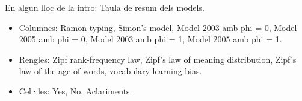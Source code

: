 En algun lloc de la intro: Taula de resum dels models.
\begin{itemize}
\item Columnes: Ramon typing, Simon's model, Model 2003 amb phi = 0, Model 2005 amb phi = 0, Model 2003 amb phi = 1, Model 2005 amb phi = 1.
\item Rengles: Zipf rank-frequency law, Zipf's law of meaning distribution, Zipf's law of the age of words, vocabulary learning bias.
\item Cel·les: Yes, No, Aclariments.
\end{itemize}

